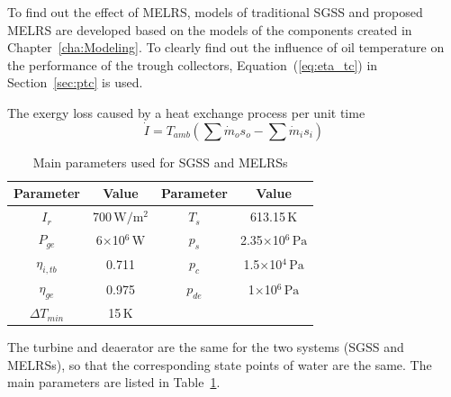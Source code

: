 To find out the effect of MELRS, models of traditional SGSS and proposed MELRS are developed based on the models of the components created in Chapter~\ref{cha:Modeling}. 
To clearly find out the influence of oil temperature on the performance of the trough collectors, Equation~(\ref{eq:eta_tc}) in Section~\ref{sec:ptc} is used.

The exergy loss caused by a heat exchange process per unit time
\begin{equation}
  \dot{I} = T_{amb} (\sum \dot{m}_os_o - \sum \dot{m}_is_i)
  \label{eq:dot_I}
\end{equation}

\begin{table}[htbp]
	\caption{Main parameters used for SGSS and MELRSs}
	\begin{center}
	\begin{tabular}{cccc}
		\toprule
		Parameter		&	Value	&	Parameter		&	Value\\
		\midrule
		$I_r$	&	700$\,\mathrm{W/m^2}$	&	$T_s$		&	613.15$\,\mathrm{K}$\\
		$P_{ge}$	&	6$\times$10$^6\,\mathrm{W}$	&	$p_s$		&	2.35$\times$10$^6\,\mathrm{Pa}$\\
		$\eta_{i,tb}$	&	0.711	&	$p_c$		&	1.5$\times$10$^4\,\mathrm{Pa}$\\
		$\eta_{ge}$	&	0.975	&	$p_{de}$		&	1$\times$10$^6\,\mathrm{Pa}$\\
		$\Delta T_{min}$	&	15$\,\mathrm{K}$	&	&\\		
		\bottomrule
	\end{tabular}
	\end{center}
	\label{tab:ptc}
\end{table}

The turbine and deaerator are the same for the two systems (SGSS and MELRSs), so that the corresponding state points of water are the same. The main parameters are listed in Table~\ref{tab:ptc}.

